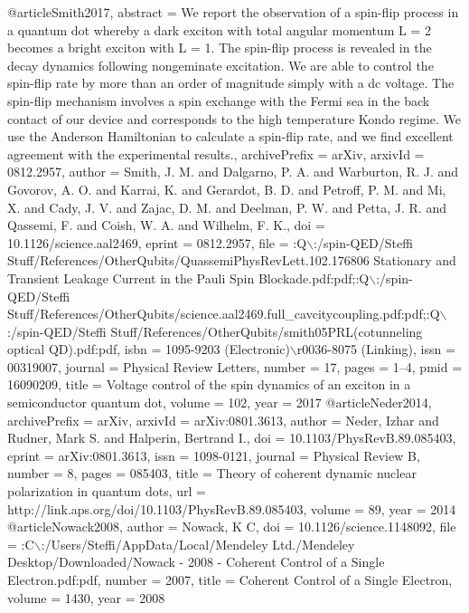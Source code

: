 @article{Smith2017,
abstract = {We report the observation of a spin-flip process in a quantum dot whereby a dark exciton with total angular momentum L = 2 becomes a bright exciton with L = 1. The spin-flip process is revealed in the decay dynamics following nongeminate excitation. We are able to control the spin-flip rate by more than an order of magnitude simply with a dc voltage. The spin-flip mechanism involves a spin exchange with the Fermi sea in the back contact of our device and corresponds to the high temperature Kondo regime. We use the Anderson Hamiltonian to calculate a spin-flip rate, and we find excellent agreement with the experimental results.},
archivePrefix = {arXiv},
arxivId = {0812.2957},
author = {Smith, J. M. and Dalgarno, P. A. and Warburton, R. J. and Govorov, A. O. and Karrai, K. and Gerardot, B. D. and Petroff, P. M. and Mi, X. and Cady, J. V. and Zajac, D. M. and Deelman, P. W. and Petta, J. R. and Qassemi, F. and Coish, W. A. and Wilhelm, F. K.},
doi = {10.1126/science.aal2469},
eprint = {0812.2957},
file = {:Q$\backslash$:/spin-QED/Steffi Stuff/References/OtherQubits/QuassemiPhysRevLett.102.176806 Stationary and Transient Leakage Current in the Pauli Spin Blockade.pdf:pdf;:Q$\backslash$:/spin-QED/Steffi Stuff/References/OtherQubits/science.aal2469.full{\_}cavcitycoupling.pdf:pdf;:Q$\backslash$:/spin-QED/Steffi Stuff/References/OtherQubits/smith05PRL(cotunneling optical QD).pdf:pdf},
isbn = {1095-9203 (Electronic)$\backslash$r0036-8075 (Linking)},
issn = {00319007},
journal = {Physical Review Letters},
number = {17},
pages = {1--4},
pmid = {16090209},
title = {{Voltage control of the spin dynamics of an exciton in a semiconductor quantum dot}},
volume = {102},
year = {2017}
}
@article{Neder2014,
archivePrefix = {arXiv},
arxivId = {arXiv:0801.3613},
author = {Neder, Izhar and Rudner, Mark S. and Halperin, Bertrand I.},
doi = {10.1103/PhysRevB.89.085403},
eprint = {arXiv:0801.3613},
issn = {1098-0121},
journal = {Physical Review B},
number = {8},
pages = {085403},
title = {{Theory of coherent dynamic nuclear polarization in quantum dots}},
url = {http://link.aps.org/doi/10.1103/PhysRevB.89.085403},
volume = {89},
year = {2014}
}
@article{Nowack2008,
author = {Nowack, K C},
doi = {10.1126/science.1148092},
file = {:C$\backslash$:/Users/Steffi/AppData/Local/Mendeley Ltd./Mendeley Desktop/Downloaded/Nowack - 2008 - Coherent Control of a Single Electron.pdf:pdf},
number = {2007},
title = {{Coherent Control of a Single Electron}},
volume = {1430},
year = {2008}
}
